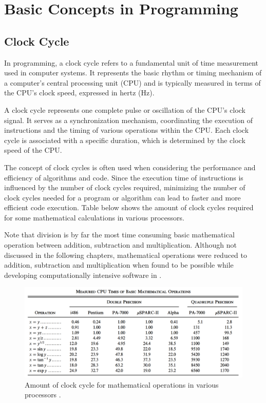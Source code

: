 \documentclass[a4paper,oneside,12pt]{report}
\numberwithin{equation}{chapter}
\begin{document}
\clearpage
\section{Basic Concepts in Programming}

\subsection{Clock Cycle}

In programming, a clock cycle refers to a fundamental unit of time measurement used in computer systems. 
It represents the basic rhythm or timing mechanism of a computer's central processing unit (CPU) and is typically measured in terms of the CPU's clock speed, expressed in hertz (Hz).

A clock cycle represents one complete pulse or oscillation of the CPU's clock signal. 
It serves as a synchronization mechanism, coordinating the execution of instructions and the timing of various operations within the CPU.
Each clock cycle is associated with a specific duration, which is determined by the clock speed of the CPU.

The concept of clock cycles is often used when considering the performance and efficiency of algorithms and code. 
Since the execution time of instructions is influenced by the number of clock cycles required, minimizing the number of clock cycles needed for a program or algorithm can lead to faster and more efficient code execution.
Table below shows the amount of clock cycles required for some mathematical calculations in various processors.

Note that division is by far the most time consuming basic mathematical operation between addition, subtraction and multiplication.
Although not discussed in the following chapters, mathematical operations were reduced to addition, subtraction and multiplication when found to be possible while developing computationally intensive software in .

\begin{figure}[H]
    \centering
    \includegraphics[width=.95\textwidth]{./figures/cpu_instruction_speed.png}
    \vspace{20pt}
    \caption{Amount of clock cycle for mathematical operations in various processors \cite{cpu_instruction_speed}.}
\end{figure}
\end{document}
